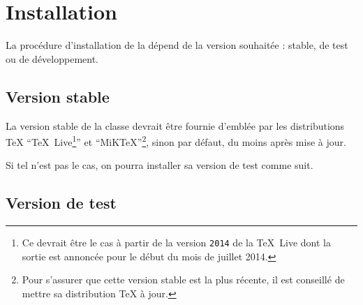 \chapter{Installation}
\label{cha:installation}

\lstset{%
  basicstyle=\ttfamily\NoAutoSpacing,
  columns=flexible,
  frame=single
}

La procédure d'installation de la \yatcl{} dépend de la version souhaitée :
stable, de test ou de développement.

\section{Version stable}
\label{sec:version-stable}

La version stable de la classe devrait être fournie d'emblée par les
distributions \TeX{} \enquote{\TeX~Live\footnote{Ce devrait être le cas
    à partir de la version \texttt{2014} de la \TeX~Live dont la sortie est
    annoncée pour le début du mois de juillet 2014.}} et
\enquote{MiK\TeX{}}\footnote{Pour s'assurer que cette version stable est la
  plus récente, il est conseillé de mettre sa distribution \TeX{} à jour.},
sinon par défaut, du moins après mise à jour.

Si tel n'est pas le cas, on pourra installer sa version de test comme suit.

\section{Version de test}
\label{sec:version-de-test}


